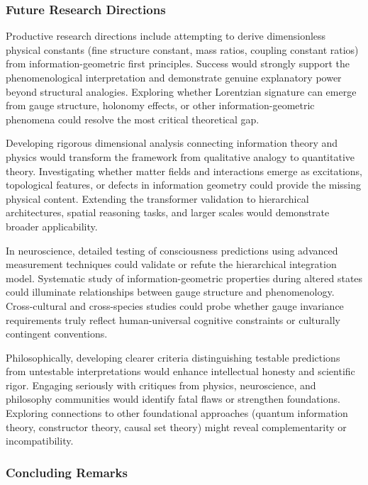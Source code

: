 \documentclass[11pt]{article}
\begin{document}
\subsubsection{Future Research Directions}

Productive research directions include attempting to derive dimensionless physical constants (fine structure constant, mass ratios, coupling constant ratios) from information-geometric first principles. Success would strongly support the phenomenological interpretation and demonstrate genuine explanatory power beyond structural analogies. Exploring whether Lorentzian signature can emerge from gauge structure, holonomy effects, or other information-geometric phenomena could resolve the most critical theoretical gap.

Developing rigorous dimensional analysis connecting information theory and physics would transform the framework from qualitative analogy to quantitative theory. Investigating whether matter fields and interactions emerge as excitations, topological features, or defects in information geometry could provide the missing physical content. Extending the transformer validation to hierarchical architectures, spatial reasoning tasks, and larger scales would demonstrate broader applicability.

In neuroscience, detailed testing of consciousness predictions using advanced measurement techniques could validate or refute the hierarchical integration model. Systematic study of information-geometric properties during altered states could illuminate relationships between gauge structure and phenomenology. Cross-cultural and cross-species studies could probe whether gauge invariance requirements truly reflect human-universal cognitive constraints or culturally contingent conventions.

Philosophically, developing clearer criteria distinguishing testable predictions from untestable interpretations would enhance intellectual honesty and scientific rigor. Engaging seriously with critiques from physics, neuroscience, and philosophy communities would identify fatal flaws or strengthen foundations. Exploring connections to other foundational approaches (quantum information theory, constructor theory, causal set theory) might reveal complementarity or incompatibility.

\subsubsection{Concluding Remarks}
\end{document}
